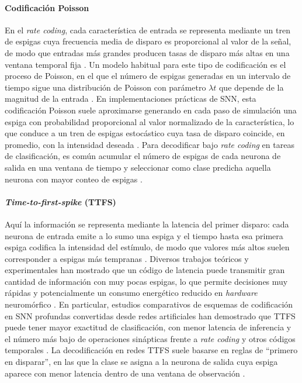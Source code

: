 \paragraph{Codificación Poisson} En el \textit{rate coding}, cada característica de entrada se representa mediante un tren de espigas cuya frecuencia media de disparo es proporcional al valor de la señal, de modo que entradas más grandes producen tasas de disparo más altas en una ventana temporal fija \cite{Guo2021neuronalcodingsnn}. Un modelo habitual para este tipo de codificación es el proceso de Poisson, en el que el número de espigas generadas en un intervalo de tiempo sigue una distribución de Poisson con parámetro $\lambda t$ que depende de la magnitud de la entrada \cite{Pachitariu2002modelsspiketrains, Yamazaki2022snnapplications}. En implementaciones prácticas de SNN, esta codificación Poisson suele aproximarse generando en cada paso de simulación una espiga con probabilidad proporcional al valor normalizado de la característica, lo que conduce a un tren de espigas estocástico cuya tasa de disparo coincide, en promedio, con la intensidad deseada \cite{Pachitariu2002modelsspiketrains}. Para decodificar bajo \textit{rate coding} en tareas de clasificación, es común acumular el número de espigas de cada neurona de salida en una ventana de tiempo y seleccionar como clase predicha aquella neurona con mayor conteo de espigas \cite{Guo2021neuronalcodingsnn}.

\paragraph{\textit{Time-to-first-spike} (TTFS)}
Aquí la información se representa mediante la latencia del primer disparo: cada neurona de entrada emite a lo sumo una espiga y el tiempo hasta esa primera espiga codifica la intensidad del estímulo, de modo que valores más altos suelen corresponder a espigas más tempranas \cite{Guo2021neuronalcodingsnn, Bonilla2022ttfs}. Diversos trabajos teóricos y experimentales han mostrado que un código de latencia puede transmitir gran cantidad de información con muy pocas espigas, lo que permite decisiones muy rápidas y potencialmente un consumo energético reducido en \textit{hardware} neuromórfico \cite{Bonilla2022ttfs}. En particular, estudios comparativos de esquemas de codificación en SNN profundas convertidas desde redes artificiales han demostrado que TTFS puede tener mayor exactitud de clasificación, con menor latencia de inferencia y el número más bajo de operaciones sinápticas frente a \textit{rate coding} y otros códigos temporales \cite{Guo2021neuronalcodingsnn}. La decodificación en redes TTFS suele basarse en reglas de “primero en disparar”, en las que la clase se asigna a la neurona de salida cuya espiga aparece con menor latencia dentro de una ventana de observación \cite{Bonilla2022ttfs, Goltz2021ttfsdeeplearning}.

